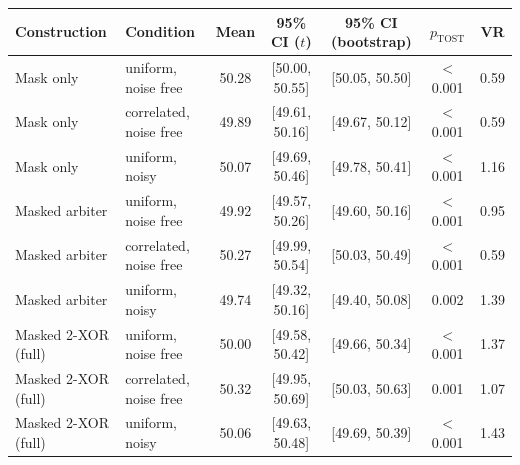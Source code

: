 \begin{tabular}{llccccc}
\toprule
Construction & Condition & Mean & 95\% CI ($t$) & 95\% CI (bootstrap) & $p_{\mathrm{TOST}}$ & VR \\
\midrule
Mask only & uniform, noise free & 50.28 & [50.00, 50.55] & [50.05, 50.50] & $<$0.001 & 0.59 \\
Mask only & correlated, noise free & 49.89 & [49.61, 50.16] & [49.67, 50.12] & $<$0.001 & 0.59 \\
Mask only & uniform, noisy & 50.07 & [49.69, 50.46] & [49.78, 50.41] & $<$0.001 & 1.16 \\
Masked arbiter & uniform, noise free & 49.92 & [49.57, 50.26] & [49.60, 50.16] & $<$0.001 & 0.95 \\
Masked arbiter & correlated, noise free & 50.27 & [49.99, 50.54] & [50.03, 50.49] & $<$0.001 & 0.59 \\
Masked arbiter & uniform, noisy & 49.74 & [49.32, 50.16] & [49.40, 50.08] & 0.002 & 1.39 \\
Masked 2-XOR (full) & uniform, noise free & 50.00 & [49.58, 50.42] & [49.66, 50.34] & $<$0.001 & 1.37 \\
Masked 2-XOR (full) & correlated, noise free & 50.32 & [49.95, 50.69] & [50.03, 50.63] & 0.001 & 1.07 \\
Masked 2-XOR (full) & uniform, noisy & 50.06 & [49.63, 50.48] & [49.69, 50.39] & $<$0.001 & 1.43 \\
\bottomrule
\end{tabular}
